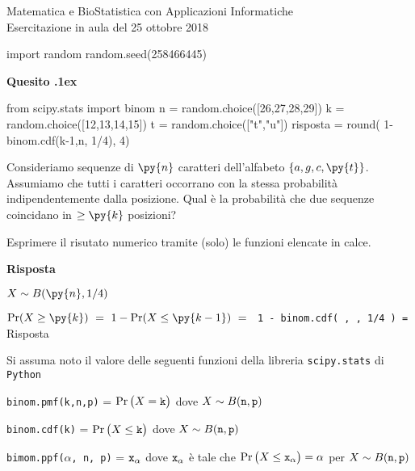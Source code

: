 \documentclass[11pt,twoside,a4paper]{article}
\newcounter{quesito}
\newenvironment{question}{\addtocounter{quesito}{1}\bigskip\bigskip\par\textbf{Quesito \thequesito.\kern1ex}}{\vspace{\parskip}}
\newenvironment{answer}{\par\textbf{Risposta\quad}}{\vspace{\parskip}}
\begin{document}
\colorbox{blue!10}{\begin{minipage}{\textwidth}
Matematica e BioStatistica con Applicazioni Informatiche\\
Esercitazione in aula del 25 ottobre 2018
\end{minipage}}

\bigskip


\begin{pycode}
import random
random.seed(258466445)
\end{pycode}


\begin{question}
\begin{pycode}
from scipy.stats import binom
n = random.choice([26,27,28,29])
k = random.choice([12,13,14,15])
t = random.choice(["t","u"])
risposta = round( 1- binom.cdf(k-1,n, 1/4), 4)
\end{pycode}
Consideriamo sequenze di $\py{n}$ caratteri dell'alfabeto $\{a,g,c,\py{t}\}$. Assumiamo che tutti i caratteri occorrano con la stessa probabilità indipendentemente dalla posizione. Qual è la probabilità che due sequenze coincidano in $\ge\py{k}$ posizioni?  

Esprimere il risutato numerico tramite (solo) le funzioni elencate in calce. 
\begin{answer}


$X\sim B(\py{n}, 1/4)$

$\Pr(X\ge \py{k})\ =\ 1-\Pr(X\le \py{k-1})\ =\ ${\tt{\color{blue}  1 -  binom.cdf( , , 1/4 )} = }{\color{blue}\hfill Risposta}
\end{answer}
\end{question}


\vfill
\hrulefill

Si assuma noto il valore delle seguenti funzioni della libreria {\tt scipy.stats\/} di  {\tt Python\/}

{\tt binom.pmf(k,n,p)} = $\Pr\big(X={\tt k}\big)$ dove $X\sim B({\tt n},{\tt p})$ 

{\tt binom.cdf(k)} = $\Pr\big(X\le{\tt k}\big)$ dove  $X\sim B({\tt n},{\tt p})$ 

{\tt bimom.ppf($\alpha$, n, p)} = ${\tt x_\alpha}$ dove ${\tt x_\alpha}$ è tale che $\Pr\big(X\le{\tt x_\alpha}\big)=\alpha$ per $X\sim B({\tt n},{\tt p})$ 
\end{document}
